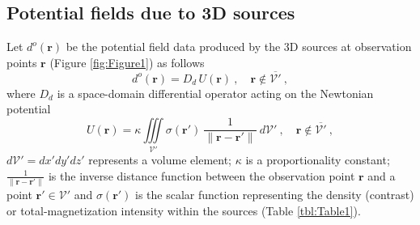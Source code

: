 \documentclass[manuscript,noblind]{geophysics}
\begin{document}
	
	\subsection{Potential fields due to 3D sources}
	\label{sec:potential_fields_3D_sources}
	
	
	Let $d^{o}(\mathbf{r})$ be the potential field data produced by the 3D sources at observation points 
	$\mathbf{r}$ (Figure \ref{fig:Figure1}) as follows
	\begin{equation}
		d^{o}(\mathbf{r}) = D_{d} \, U(\mathbf{r}) \: , 
		\quad \mathbf{r} \notin \overline{\mathcal{V}'} \: ,
		\label{eq:observed-data-space}
	\end{equation}
	where $D_{d}$ is a space-domain differential operator acting on the Newtonian potential
	\begin{equation}
		U(\mathbf{r}) = \kappa \iiint\limits_{\mathcal{V}'}
		\sigma(\mathbf{r}') \: \frac{1}{\| \mathbf{r} - \mathbf{r}'\|}
		\: d\mathcal{V}' \: , 
		\quad \mathbf{r} \notin \overline{\mathcal{V}'} \: ,
		\label{eq:potential-U-space}
	\end{equation}
	$d\mathcal{V}' = dx'dy'dz'$ represents a volume element;
	$\kappa$ is a proportionality constant;
	$\tfrac{1}{\| \mathbf{r} - \mathbf{r}' \|}$ is the inverse distance function
	between the observation point $\mathbf{r}$ and a point $\mathbf{r}' \in \mathcal{V}'$
	and $\sigma(\mathbf{r}')$ is the scalar function representing 
	the density (contrast) or total-magnetization intensity within the sources (Table \ref{tbl:Table1}).
	
\end{document}
